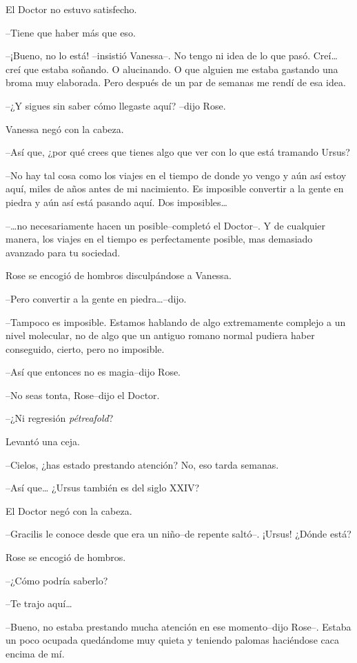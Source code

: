 El Doctor no estuvo satisfecho.

--Tiene que haber más que eso.

--¡Bueno, no lo está! --insistió Vanessa--. No tengo ni idea de lo que
pasó. Creí\ldots{} creí que estaba soñando. O alucinando. O que alguien
me estaba gastando una broma muy elaborada. Pero después de un par de
semanas me rendí de esa idea.

--¿Y sigues sin saber cómo llegaste aquí? --dijo Rose.

Vanessa negó con la cabeza.

--Así que, ¿por qué crees que tienes algo que ver con lo que está
tramando Ursus?

--No hay tal cosa como los viajes en el tiempo de donde yo vengo y aún
así estoy aquí, miles de años antes de mi nacimiento. Es imposible
convertir a la gente en piedra y aún así está pasando aquí. Dos
imposibles\ldots{}

--\ldots{}no necesariamente hacen un posible--completó el Doctor--. Y de
cualquier manera, los viajes en el tiempo es perfectamente posible, mas
demasiado avanzado para tu sociedad.

Rose se encogió de hombros disculpándose a Vanessa.

--Pero convertir a la gente en piedra\ldots{}--dijo.

--Tampoco es imposible. Estamos hablando de algo extremamente complejo a
un nivel molecular, no de algo que un antiguo romano normal pudiera
haber conseguido, cierto, pero no imposible.

--Así que entonces no es magia--dijo Rose.

--No seas tonta, Rose--dijo el Doctor.

--¿Ni regresión \emph{pétreafold}?

Levantó una ceja.

--Cielos, ¿has estado prestando atención? No, eso tarda semanas.

--Así que\ldots{} ¿Ursus también es del siglo XXIV?

El Doctor negó con la cabeza.

--Gracilis le conoce desde que era un niño--de repente saltó--. ¡Ursus!
¿Dónde está?

Rose se encogió de hombros.

--¿Cómo podría saberlo?

--Te trajo aquí\ldots{}

--Bueno, no estaba prestando mucha atención en ese momento--dijo Rose--.
Estaba un poco ocupada quedándome muy quieta y teniendo palomas
haciéndose caca encima de mí.

